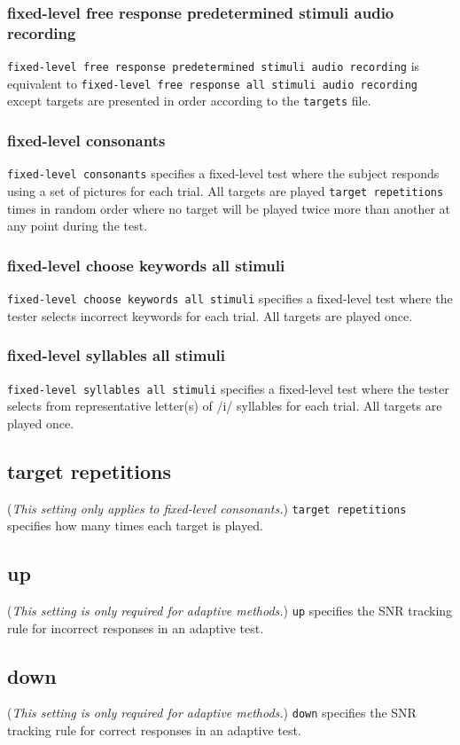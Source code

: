 \documentclass[11pt,pdftex,letterpaper]{article}
\begin{document}
\subsubsection{fixed-level free response predetermined stimuli audio recording}
\texttt{fixed-level free response predetermined stimuli audio recording} is equivalent to \texttt{fixed-level free response all stimuli audio recording} except targets are presented in order according to the \texttt{targets} file.
\subsubsection{fixed-level consonants}
\texttt{fixed-level consonants} specifies a fixed-level test where the subject responds using a set of pictures for each trial. All targets are played \texttt{target repetitions} times in random order where no target will be played twice more than another at any point during the test.
\subsubsection{fixed-level choose keywords all stimuli}
\texttt{fixed-level choose keywords all stimuli} specifies a fixed-level test where the tester selects incorrect keywords for each trial. All targets are played once.
\subsubsection{fixed-level syllables all stimuli}
\texttt{fixed-level syllables all stimuli} specifies a fixed-level test where the tester selects from representative letter(s) of /i/ syllables for each trial. All targets are played once.
\subsection{target repetitions}
(\textit{This setting only applies to fixed-level consonants.}) \texttt{target repetitions} specifies how many times each target is played. 
\subsection{up}
(\textit{This setting is only required for adaptive methods.}) \texttt{up} specifies the SNR tracking rule for incorrect responses in an adaptive test.
\subsection{down}
(\textit{This setting is only required for adaptive methods.}) \texttt{down} specifies the SNR tracking rule for correct responses in an adaptive test.
\end{document}
